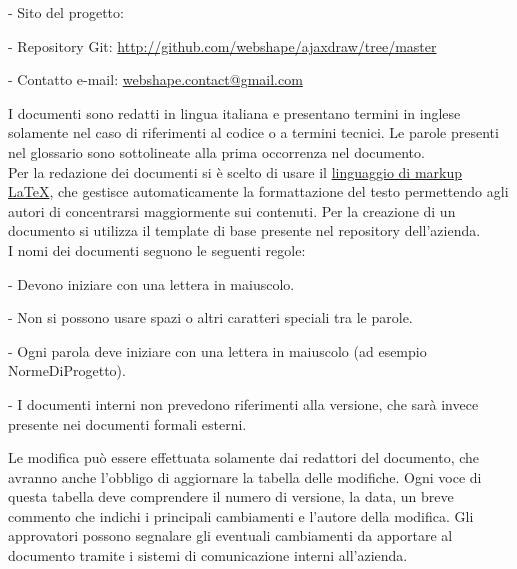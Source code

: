  
\newpage
\thispagestyle{fancy}
\tableofcontents
\thispagestyle{fancy}
\newpage
 
  \begin{elencopuntato}[\normindent]
    \item[-] Sito del progetto: \sito
    \item[-] Repository Git: \href{http://github.com/webshape/ajaxdraw/tree/master}{http://github.com/webshape/ajaxdraw/tree/master}
    \item[-] Contatto e-mail: \href{mailto:webshape.contact@gmail.com}{webshape.contact@gmail.com}
  \end{elencopuntato}
 
  I documenti sono redatti in lingua italiana e presentano termini in inglese solamente nel caso di riferimenti al codice o a termini tecnici. Le parole presenti nel glossario sono sottolineate alla prima occorrenza nel documento.\\
  Per la redazione dei documenti si \`e scelto di usare il \underline{linguaggio di markup} \underline{\LaTeX}, che gestisce automaticamente la formattazione del testo permettendo agli autori di concentrarsi maggiormente sui contenuti. Per la creazione di un documento si utilizza il template di base presente nel repository dell'azienda.\\
  I nomi dei documenti seguono le seguenti regole:
  \begin{elencopuntato}[\normindent]
    \item[-] Devono iniziare con una lettera in maiuscolo.
    \item[-] Non si possono usare spazi o altri caratteri speciali tra le parole.
    \item[-] Ogni parola deve iniziare con una lettera in maiuscolo (ad esempio NormeDiProgetto).
    \item[-] I documenti interni non prevedono riferimenti alla versione, che sar\`a invece presente nei documenti formali esterni.
  \end{elencopuntato}
  
  Le modifica pu\`o essere effettuata solamente dai redattori del documento, che avranno anche l'obbligo di aggiornare la tabella delle modifiche. Ogni voce di questa tabella deve comprendere il numero di versione, la data, un breve commento che indichi i principali cambiamenti e l'autore della modifica.
  Gli approvatori possono segnalare gli eventuali cambiamenti da apportare al documento tramite i sistemi di comunicazione interni all'azienda.
  

